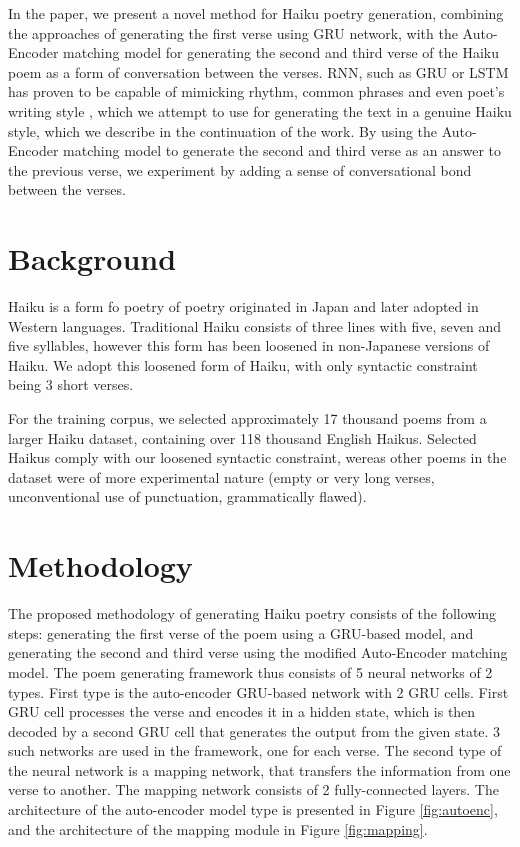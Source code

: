 \documentclass{acm_proc_article-sp}
\begin{document}
In the paper, we present a novel method for Haiku poetry generation, combining the approaches of generating the first verse using GRU network, with the Auto-Encoder matching model \cite{luo2018autoencoder} for generating the second and third verse of the Haiku poem as a form of conversation between the verses. RNN, such as GRU or LSTM has proven to be capable of mimicking rhythm, common phrases and even poet's writing style \cite{potash2015ghostwriter}, which we attempt to use for generating the text in a genuine Haiku style, which we describe in the continuation of the work. By using the Auto-Encoder matching model to generate the second and third verse as an answer to the previous verse, we experiment by adding a sense of conversational bond between the verses.

\section{Background}

Haiku is a form fo poetry of poetry originated in Japan and later adopted in Western languages. Traditional Haiku consists of three lines with five, seven and five syllables, however this form has been loosened in non-Japanese versions of Haiku. We adopt this loosened form of Haiku, with only syntactic constraint being 3 short verses.

For the training corpus, we selected approximately 17 thousand poems from a larger Haiku dataset, containing over 118 thousand English Haikus. Selected Haikus comply with our loosened syntactic constraint, wereas other poems in the dataset were of more experimental nature (empty or very long verses, unconventional use of punctuation, grammatically flawed).

\section{Methodology}

The proposed methodology of generating Haiku poetry consists of the following steps: generating the first verse of the poem using a GRU-based model, and generating the second and third verse using the modified Auto-Encoder matching model. The poem generating framework thus consists of 5 neural networks of 2 types. First type is the auto-encoder GRU-based network with 2 GRU cells. First GRU cell processes the verse and encodes it in a hidden state, which is then decoded by a second GRU cell that generates the output from the given state. 3 such networks are used in the framework, one for each verse. The second type of the neural network is a mapping network, that transfers the information from one verse to another. The mapping network consists of 2 fully-connected layers. The architecture of the auto-encoder model type is presented in Figure \ref{fig:autoenc}, and the architecture of the mapping module in Figure \ref{fig:mapping}.
\end{document}
